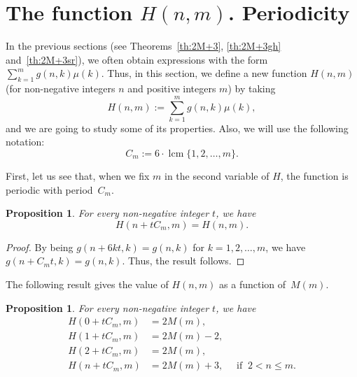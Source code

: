 \documentclass[10pt]{amsart}
\newcommand{\lcm}{\operatorname{lcm}}
\newtheorem{propo}[theor]{Proposition}
\begin{document}
\section{The function $H(n,m)$. Periodicity}
\label{sec:H}

In the previous sections (see Theorems~\ref{th:2M+3},
\ref{th:2M+3gh} and~\ref{th:2M+3sr}),
we often obtain expressions with the form
$\sum_{k=1}^m g(n,k)\mu(k)$.
Thus, in this section, we define a new function $H(n,m)$
(for non-negative integers $n$ and positive integers $m$) by taking
$$
H(n,m) := \sum_{k=1}^m g(n,k)\mu(k),
$$
and we are going to study some of its properties.
Also, we will use the following notation:
$$
C_m := 6 \cdot \lcm \{1,2,\ldots,m\}.
$$

First, let us see that, when we fix $m$ in the second variable of $H$,
the function is periodic with period~$C_m$.

\begin{propo}
\label{th:H}
For every non-negative integer $t$, we have
$$
H(n + t C_m,m) = H(n,m).
$$
\end{propo}

\begin{proof}
By being $g(n+{6k}t, k) = g(n,k)$ for $k=1,2,\ldots, m$, we have
$g(n+C_mt,k) = g(n,k)$. Thus, the result follows.
\end{proof}

The following result gives the value of $H(n,m)$ as a function of~$M(m)$.

\begin{propo}
For every non-negative integer $t$, we have
\begin{align*}
H(0 + t C_m,m) &= 2M(m),\\
H(1 + t C_m,m) &= 2M(m)-2,\\
H(2 + t C_m,m) &= 2M(m),\\
H(n + t C_m,m) &= 2M(m)+3, \quad \mbox { if }\ 2<n\leq m .
\end{align*}
\end{propo}
\end{document}
